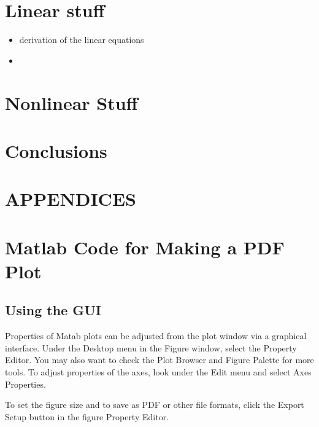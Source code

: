 \documentclass[letterpaper,12pt,titlepage,oneside,final]{book}
\begin{document}
\chapter{Linear stuff} 
\begin{itemize}
	\item derivation of the linear equations
	\item 
\end{itemize} 

\chapter{Nonlinear Stuff}


\chapter{Conclusions}


\appendix

\chapter*{APPENDICES}
\chapter[PDF Plots From Matlab]{Matlab Code for Making a PDF Plot}
\label{AppendixA}
\section{Using the GUI}
Properties of Matab plots can be adjusted from the plot window via a graphical interface. Under the Desktop menu in the Figure window, select the Property Editor. You may also want to check the Plot Browser and Figure Palette for more tools. To adjust properties of the axes, look under the Edit menu and select Axes Properties.

To set the figure size and to save as PDF or other file formats, click the Export Setup button in the figure Property Editor.
\end{document}
